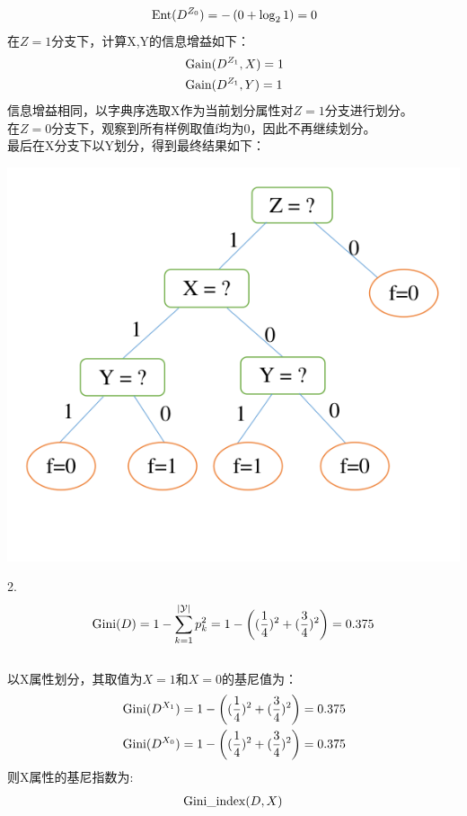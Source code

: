 \documentclass[answers]{exam}  %
\begin{document}
\begin{questions}
\begin{solution}
$$\begin{aligned}
            &\operatornamewithlimits{Ent}(D^{Z_0})=-\left(0+\log_2{1}\right)=0\\
        \end{aligned}
        $$
        在$Z=1$分支下，计算X,Y的信息增益如下：
        $$
        \begin{aligned}
            &\operatornamewithlimits{Gain}(D^{Z_1},X)=1\\
            &\operatornamewithlimits{Gain}(D^{Z_1},Y)=1\\
        \end{aligned}
        $$
        信息增益相同，以字典序选取X作为当前划分属性对$Z=1$分支进行划分。\\
        在$Z=0$分支下，观察到所有样例取值f均为0，因此不再继续划分。\\
        最后在X分支下以Y划分，得到最终结果如下：\\
        \centerline{\includegraphics[width=0.7\linewidth]{ALL.png}}
        2.\\
        $$\operatornamewithlimits{Gini}(D)=1-\sum^{|\mathcal Y|}_{k=1}p_k^2=1-\left(({\frac14})^2+({\frac34})^2\right)=0.375$$\\
        以X属性划分，其取值为$X=1$和$X=0$的基尼值为：
        $$
        \begin{aligned}
            &\operatornamewithlimits{{Gini}}(D^{X_1})=1-\left(({\frac14})^2+({\frac34})^2\right)=0.375\\
            &\operatornamewithlimits{{Gini}}(D^{X_0})=1-\left(({\frac14})^2+({\frac34})^2\right)=0.375\\
        \end{aligned}
        $$
        则X属性的基尼指数为:
        $$
        \begin{aligned}
            \operatornamewithlimits{Gini\_index}(D,X)

\end{aligned}$$
\end{solution}
\end{questions}
\end{document}
